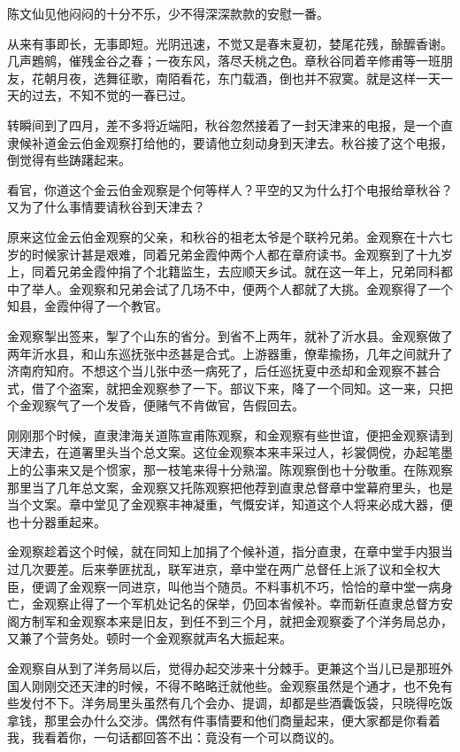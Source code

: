 \documentclass[12pt,UTF8]{ctexbook}
\begin{document}
{{{陈文仙见他闷闷的十分不乐，少不得深深款款的安慰一番。

从来有事即长，无事即短。光阴迅速，不觉又是春末夏初，婪尾花残，酴醿香谢。几声鶗鹓，催残金谷之春；一夜东风，落尽夭桃之色。章秋谷同着辛修甫等一班朋友，花朝月夜，选舞征歌，南陌看花，东门载酒，倒也并不寂寞。就是这样一天一天的过去，不知不觉的一春已过。

转瞬间到了四月，差不多将近端阳，秋谷忽然接着了一封天津来的电报，是一个直隶候补道金云伯金观察打给他的，要请他立刻动身到天津去。秋谷接了这个电报，倒觉得有些踌躇起来。

看官，你道这个金云伯金观察是个何等样人？平空的又为什么打个电报给章秋谷？又为了什么事情要请秋谷到天津去？

原来这位金云伯金观察的父亲，和秋谷的祖老太爷是个联衿兄弟。金观察在十六七岁的时候家计甚是艰难，同着兄弟金霞仲两个人都在章府读书。金观察到了十九岁上，同着兄弟金霞仲捐了个北籍监生，去应顺天乡试。就在这一年上，兄弟同科都中了举人。金观察和兄弟会试了几场不中，便两个人都就了大挑。金观察得了一个知县，金霞仲得了一个教官。

金观察掣出签来，掣了个山东的省分。到省不上两年，就补了沂水县。金观察做了两年沂水县，和山东巡抚张中丞甚是合式。上游器重，僚辈揄扬，几年之间就升了济南府知府。不想这个当儿张中丞一病死了，后任巡抚夏中丞却和金观察不甚合式，借了个盗案，就把金观察参了一下。部议下来，降了一个同知。这一来，只把个金观察气了一个发昏，便赌气不肯做官，告假回去。

刚刚那个时候，直隶津海关道陈宣甫陈观察，和金观察有些世谊，便把金观察请到天津去，在道署里头当个总文案。这位金观察本来丰采过人，衫裳倜傥，办起笔墨上的公事来又是个惯家，那一枝笔来得十分熟溜。陈观察倒也十分敬重。在陈观察那里当了几年总文案，金观察又托陈观察把他荐到直隶总督章中堂幕府里头，也是当个文案。章中堂见了金观察丰神凝重，气慨安详，知道这个人将来必成大器，便也十分器重起来。

金观察趁着这个时候，就在同知上加捐了个候补道，指分直隶，在章中堂手内狠当过几次要差。后来拳匪扰乱，联军进京，章中堂在两广总督任上派了议和全权大臣，便调了金观察一同进京，叫他当个随员。不料事机不巧，恰恰的章中堂一病身亡，金观察止得了一个军机处记名的保举，仍回本省候补。幸而新任直隶总督方安阁方制军和金观察本来是旧友，到任不到三个月，就把金观察委了个洋务局总办，又兼了个营务处。顿时一个金观察就声名大振起来。

金观察自从到了洋务局以后，觉得办起交涉来十分棘手。更兼这个当儿已是那班外国人刚刚交还天津的时候，不得不略略迁就他些。金观察虽然是个通才，也不免有些发付不下。洋务局里头虽然有几个会办、提调，却都是些酒囊饭袋，只晓得吃饭拿钱，那里会办什么交涉。偶然有件事情要和他们商量起来，便大家都是你看着我，我看着你，一句话都回答不出：竟没有一个可以商议的。

}}}
\end{document}
